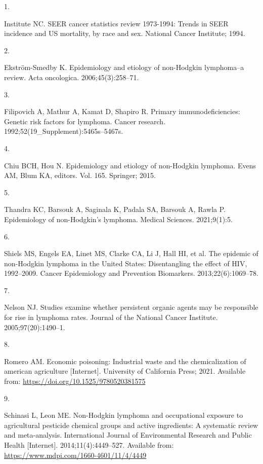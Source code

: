 \documentclass[
  11pt,
  letterpaper,
  DIV=11,
  numbers=noendperiod]{scrartcl}
\newlength{\cslhangindent}
\newlength{\csllabelwidth}
\newenvironment{CSLReferences}[2] %
 {\begin{list}{}{%
  \setlength{\itemindent}{0pt}
  \setlength{\leftmargin}{0pt}
  \setlength{\parsep}{0pt}
  \ifodd #1
   \setlength{\leftmargin}{\cslhangindent}
   \setlength{\itemindent}{-1\cslhangindent}
  \fi
  \setlength{\itemsep}{#2\baselineskip}}}
 {\end{list}}
\newcommand{\CSLLeftMargin}[1]{\parbox[t]{\csllabelwidth}{\strut#1\strut}}
\newcommand{\CSLRightInline}[1]{\parbox[t]{\linewidth - \csllabelwidth}{\strut#1\strut}}
\begin{document}
\label{refs}
\begin{CSLReferences}{1}{0}
\CSLLeftMargin{1. }%
\CSLRightInline{Institute NC. SEER cancer statistics review 1973-1994:
Trends in SEER incidence and US mortality, by race and sex. National
Cancer Institute; 1994. }

\CSLLeftMargin{2. }%
\CSLRightInline{Ekström-Smedby K. Epidemiology and etiology of
non-{Hodgkin} lymphoma--a review. Acta oncologica. 2006;45(3):258--71. }

\CSLLeftMargin{3. }%
\CSLRightInline{Filipovich A, Mathur A, Kamat D, Shapiro R. Primary
immunodeficiencies: Genetic risk factors for lymphoma. Cancer research.
1992;52(19\_Supplement):5465s--5467s. }

\CSLLeftMargin{4. }%
\CSLRightInline{Chiu BCH, Hou N. Epidemiology and etiology of
non-{Hodgkin} lymphoma. Evens AM, Blum KA, editors. Vol. 165. Springer;
2015. }

\CSLLeftMargin{5. }%
\CSLRightInline{Thandra KC, Barsouk A, Saginala K, Padala SA, Barsouk A,
Rawla P. Epidemiology of non-{Hodgkin}'s lymphoma. Medical Sciences.
2021;9(1):5. }

\CSLLeftMargin{6. }%
\CSLRightInline{Shiels MS, Engels EA, Linet MS, Clarke CA, Li J, Hall
HI, et al. The epidemic of non-{Hodgkin} lymphoma in the {United
States}: Disentangling the effect of HIV, 1992--2009. Cancer
Epidemiology and Prevention Biomarkers. 2013;22(6):1069--78. }

\CSLLeftMargin{7. }%
\CSLRightInline{Nelson NJ. Studies examine whether persistent organic
agents may be responsible for rise in lymphoma rates. Journal of the
National Cancer Institute. 2005;97(20):1490--1. }

\CSLLeftMargin{8. }%
\CSLRightInline{Romero AM. Economic poisoning: Industrial waste and the
chemicalization of american agriculture {[}Internet{]}. University of
California Press; 2021. Available from:
\url{https://doi.org/10.1525/9780520381575}}

\CSLLeftMargin{9. }%
\CSLRightInline{Schinasi L, Leon ME. Non-{Hodgkin} lymphoma and
occupational exposure to agricultural pesticide chemical groups and
active ingredients: A systematic review and meta-analysis. International
Journal of Environmental Research and Public Health {[}Internet{]}.
2014;11(4):4449--527. Available from:
\url{https://www.mdpi.com/1660-4601/11/4/4449}}


\end{CSLReferences}
\end{document}
